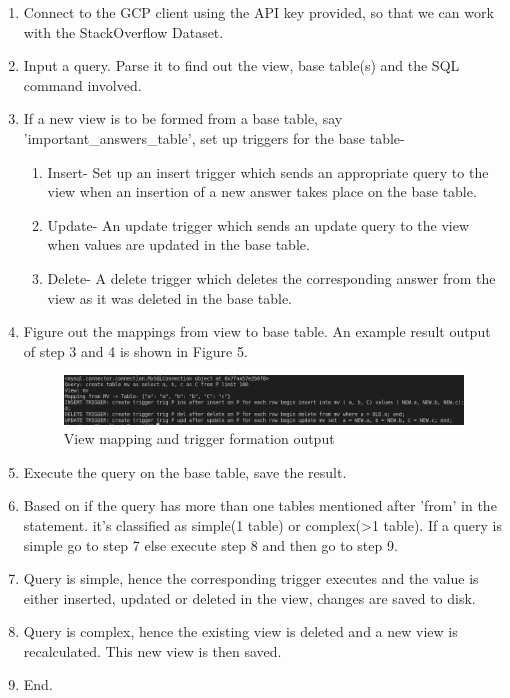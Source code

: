 \documentclass[12pt]{report}
\begin{document}
\begin{enumerate}
	\item Connect to the GCP client using the API key provided, so that we can work with the StackOverflow Dataset.
	\item Input a query. Parse it to find out the view, base table(s) and the SQL command involved.
	\item If a new view is to be formed from a base table, say 'important\_answers\_table', set up triggers for the base table- 
		\begin{enumerate}
			\item Insert- Set up an insert trigger which sends an appropriate query to the view when an insertion of a new answer takes place on the base table.
			\item Update- An update trigger which sends an update query to the view when values are updated in the base table.
			\item Delete- A delete trigger which deletes the corresponding answer from the view as it was deleted in the base table.
		\end{enumerate}
	\item Figure out the mappings from view to base table. An example result output of step 3 and 4 is shown in Figure 5.
		\begin{figure}[H]
		\centering \includegraphics[width=1\textwidth]{images/mvq.png}
		\caption{View mapping and trigger formation output}
		\end{figure}
	\item Execute the query on the base table, save the result.
	\item Based on if the query has more than one tables mentioned after 'from' in the statement. it's classified as simple(1 table) or complex(>1 table). If a query is 					simple go to step 7 else execute step 8 and then go to step 9.
	\item Query is simple, hence the corresponding trigger executes and the value is either inserted, updated or deleted in the view, changes are saved to disk.
	\item Query is complex, hence the existing view is deleted and a new view is recalculated. This new view is then saved.
	\item End.
\end{enumerate}
\pagebreak
\end{document}
